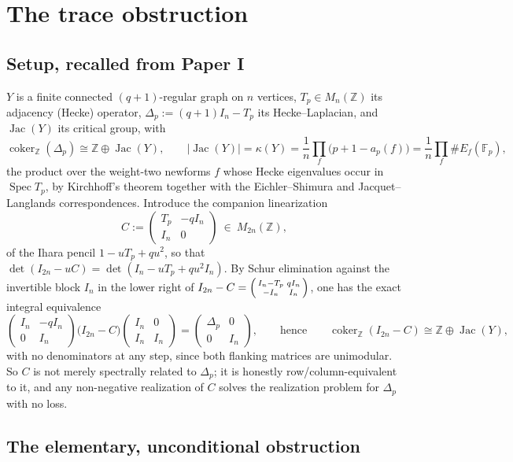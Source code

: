 \documentclass[11pt]{amsart}
\numberwithin{equation}{section}
\theoremstyle{definition}
\theoremstyle{remark}
\newcommand{\Z}{\mathbb{Z}}
\newcommand{\F}{\mathbb{F}}
\newcommand{\coker}{\operatorname{coker}}
\newcommand{\Jac}{\operatorname{Jac}}
\newcommand{\Spec}{\operatorname{Spec}}
\begin{document}
\section{The trace obstruction}\label{sec:trace}

\subsection{Setup, recalled from Paper I}

$Y$ is a finite connected $(q+1)$-regular graph on $n$ vertices, $T_p\in M_n(\Z)$ its
adjacency (Hecke) operator, $\Delta_p:=(q+1)I_n-T_p$ its Hecke--Laplacian, and
$\Jac(Y)$ its critical group, with
\[
\coker_\Z(\Delta_p)\cong\Z\oplus\Jac(Y),\qquad
\bigl|\Jac(Y)\bigr|=\kappa(Y)=\frac1n\prod_{f}\bigl(p+1-a_p(f)\bigr)=\frac1n\prod_f\#E_f(\F_p),
\]
the product over the weight-two newforms $f$ whose Hecke eigenvalues occur in
$\Spec T_p$, by Kirchhoff's theorem together with the Eichler--Shimura and
Jacquet--Langlands correspondences. Introduce the companion linearization
\[
C:=\begin{pmatrix}T_p&-qI_n\\I_n&0\end{pmatrix}\ \in\ M_{2n}(\Z),
\]
of the Ihara pencil $1-uT_p+qu^2$, so that $\det(I_{2n}-uC)=\det(I_n-uT_p+qu^2I_n)$.
By Schur elimination against the invertible block $I_n$ in the lower right of
$I_{2n}-C=\begin{psmallmatrix}I_n-T_p&qI_n\\-I_n&I_n\end{psmallmatrix}$, one has the exact
integral equivalence
\[
\begin{pmatrix}I_n&-qI_n\\0&I_n\end{pmatrix}
\bigl(I_{2n}-C\bigr)
\begin{pmatrix}I_n&0\\I_n&I_n\end{pmatrix}
=\begin{pmatrix}\Delta_p&0\\0&I_n\end{pmatrix},
\qquad\text{hence}\qquad
\coker_\Z(I_{2n}-C)\cong\Z\oplus\Jac(Y),
\]
with no denominators at any step, since both flanking matrices are unimodular. So $C$ is
not merely spectrally related to $\Delta_p$; it is honestly row/column-equivalent to it,
and any non-negative realization of $C$ solves the realization problem for $\Delta_p$
with no loss.

\subsection{The elementary, unconditional obstruction}
\end{document}
